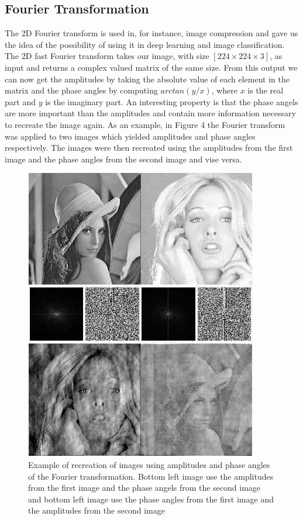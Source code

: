 \documentclass{article}
\begin{document}
\subsection{Fourier Transformation}

The 2D Fourier transform is used in, for instance, image compression and gave us the idea of the possibility of using it in deep learning and image classification. 
The 2D fast Fourier transform takes our image, with size $[224 \times 224 \times 3]$, as input and returns a complex valued matrix of the same size. From this output we can now get the amplitudes 
by taking the absolute value of each element in the matrix and the phase angles by computing $arctan(y/x)$, where $x$ is the real part and $y$ is the imaginary part. 
An interesting property is that the phase angels are more important than the amplitudes and contain more information necessary to recreate the image again. 
As an example, in Figure 4 the Fourier transform was applied to two images which yielded amplitudes and phase angles respectively. 
The images were then recreated using the amplitudes from the first image and the phase angles from the second image and vise versa. 

\begin{figure}[!htb]
	\centering
	\includegraphics[scale = 0.25]{fourier.jpg}
	\caption{Example of recreation of images using amplitudes and phase angles of the Fourier transformation. 
	Bottom left image use the amplitudes from the first image and the phase angels from the second image and 
	bottom left image use the phase angles from the first image and the amplitudes from the second image}
\end{figure}
\end{document}
